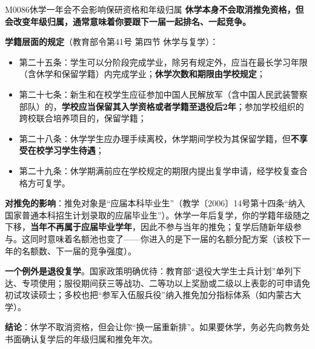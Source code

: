 \begin{qa}{M0086}{休学一年会不会影响保研资格和年级归属}
\textbf{休学本身不会取消推免资格，但会改变年级归属，通常意味着你要跟下一届一起排名、一起竞争。}

\textbf{学籍层面的规定}（教育部令第41号 第四节 休学与复学）：
\begin{itemize}
  \item 第二十五条：学生可以分阶段完成学业，除另有规定外，应当在最长学习年限（含休学和保留学籍）内完成学业；\textbf{休学次数和期限由学校规定}；
  \item 第二十七条：新生和在校学生应征参加中国人民解放军（含中国人民武装警察部队）的，\textbf{学校应当保留其入学资格或者学籍至退役后2年}；参加学校组织的跨校联合培养项目的，保留学籍；
  \item 第二十八条：休学学生应办理手续离校，休学期间学校为其保留学籍，但\textbf{不享受在校学习学生待遇}；
  \item 第二十九条：休学期满前应在学校规定的期限内提出复学申请，经学校复查合格方可复学。
\end{itemize}

\textbf{对推免的影响}：推免对象是“应届本科毕业生”（教学〔2006〕14号第十四条“纳入国家普通本科招生计划录取的应届毕业生”）。休学一年后复学，你的学籍年级随之下移，\textbf{当年不再属于应届毕业学年}，因此不参与当年的推免；复学后随新年级参与。这同时意味着名额池也变了——你进入的是下一届的名额分配方案（该校下一年的名额数、下一届的竞争强度）。

\textbf{一个例外是退役复学}。国家政策明确优待：教育部“退役大学生士兵计划”单列下达、专项使用；服役期间获三等战功、二等功以上奖励或二级以上表彰的可申请免初试攻读硕士；多校也把“参军入伍服兵役”纳入推免加分指标体系（如内蒙古大学）。

\textbf{结论}：休学不取消资格，但会让你“换一届重新排”。如果要休学，务必先向教务处书面确认复学后的年级归属和推免年次。
\end{qa}

